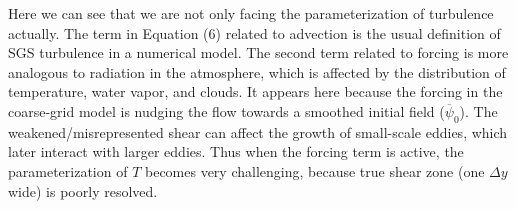 \documentclass[a4paper,11pt]{article}
\begin{document}
Here we can see that we are not only facing the parameterization of turbulence actually. The term in Equation (6) related to advection is the usual definition of SGS turbulence in a numerical model. The second term related to forcing is more analogous to radiation in the atmosphere, which is affected by the distribution of temperature, water vapor, and clouds. It appears here because the forcing in the coarse-grid model is nudging the flow towards a smoothed initial field ($\overline{\psi}_0$). The weakened/misrepresented shear can affect the growth of small-scale eddies, which later interact with larger eddies. Thus when the forcing term is active, the parameterization of $T$ becomes very challenging, because true shear zone (one $\Delta y$ wide) is poorly resolved.

% 
% 
% 
% 
%   
\end{document}
